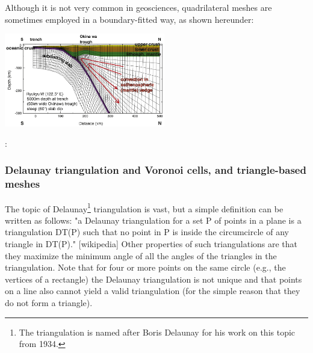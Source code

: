 
Although it is not very common in geosciences, quadrilateral meshes are sometimes 
employed in a boundary-fitted way, as shown hereunder:

\begin{center}
\includegraphics[width=7cm]{images/meshes/gukt16}\\
\end{center}


\Literature: \cite{jole97}

\subsubsection{Delaunay triangulation and Voronoi cells, and triangle-based meshes}

The topic of Delaunay\footnote{The triangulation is named after 
Boris Delaunay for his work on this topic from 1934.}
 triangulation is vast, but a simple definition can be written 
as follows:
"a Delaunay triangulation for a set P 
of points in a plane is a triangulation DT(P) such that no point in P is  
inside the circumcircle of any triangle in DT(P)." [wikipedia]
Other properties of such triangulations are that they 
maximize the minimum angle of all the angles of the 
triangles in the triangulation.
Note that for four or more 
points on the same circle (e.g., the vertices of a rectangle) the Delaunay triangulation is  
not unique and that points on a line also cannot yield a valid triangulation
(for the simple reason that they do not form a triangle).

